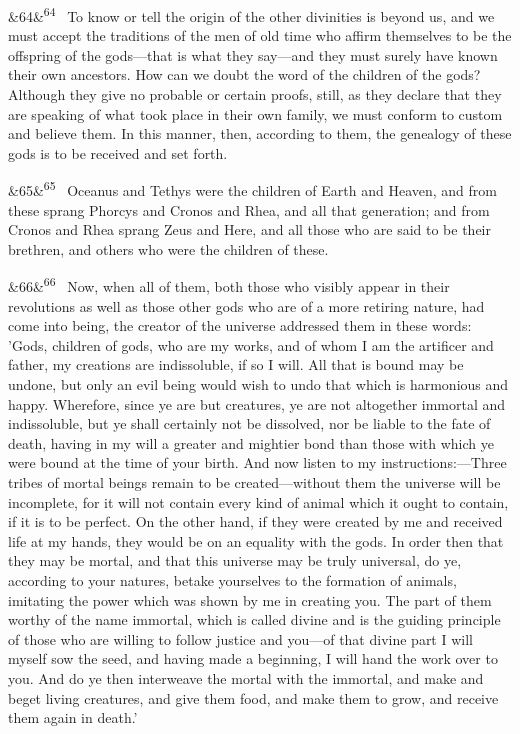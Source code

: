 \documentclass[12pt]{article}
\newcommand{\para}[1][]{\par\noindent\ifx&#1&\else\textsuperscript{\footnotesize #1}~\fi}
\begin{document}
\para[64] To know or tell the origin of the other divinities is beyond us, and we must accept the traditions of the men of old time who affirm themselves to be the offspring of the gods---that is what they say---and they must surely have known their own ancestors. How can we doubt the word of the children of the gods? Although they give no probable or certain proofs, still, as they declare that they are speaking of what took place in their own family, we must conform to custom and believe them. In this manner, then, according to them, the genealogy of these gods is to be received and set forth.

\para[65] Oceanus and Tethys were the children of Earth and Heaven, and from these sprang Phorcys and Cronos and Rhea, and all that generation; and from Cronos and Rhea sprang Zeus and Here, and all those who are said to be their brethren, and others who were the children of these.

\para[66] Now, when all of them, both those who visibly appear in their revolutions as well as those other gods who are of a more retiring nature, had come into being, the creator of the universe addressed them in these words: 'Gods, children of gods, who are my works, and of whom I am the artificer and father, my creations are indissoluble, if so I will. All that is bound may be undone, but only an evil being would wish to undo that which is harmonious and happy. Wherefore, since ye are but creatures, ye are not altogether immortal and indissoluble, but ye shall certainly not be dissolved, nor be liable to the fate of death, having in my will a greater and mightier bond than those with which ye were bound at the time of your birth. And now listen to my instructions:---Three tribes of mortal beings remain to be created---without them the universe will be incomplete, for it will not contain every kind of animal which it ought to contain, if it is to be perfect. On the other hand, if they were created by me and received life at my hands, they would be on an equality with the gods. In order then that they may be mortal, and that this universe may be truly universal, do ye, according to your natures, betake yourselves to the formation of animals, imitating the power which was shown by me in creating you. The part of them worthy of the name immortal, which is called divine and is the guiding principle of those who are willing to follow justice and you---of that divine part I will myself sow the seed, and having made a beginning, I will hand the work over to you. And do ye then interweave the mortal with the immortal, and make and beget living creatures, and give them food, and make them to grow, and receive them again in death.'
\end{document}
